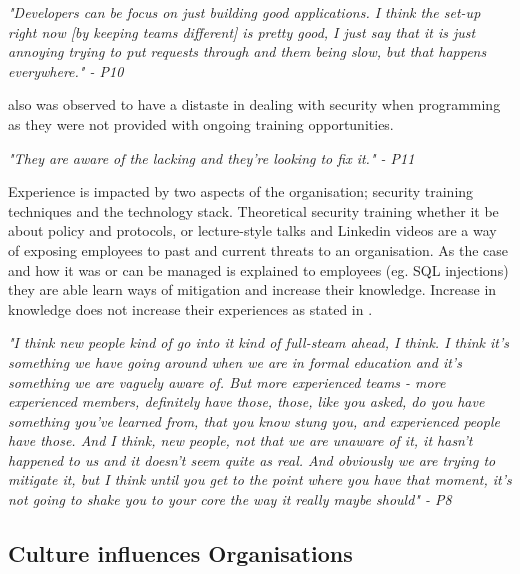 \textit{"Developers can be focus on just building good applications. I think the set-up right now [by keeping teams different] is pretty good, I just say that it is just annoying trying to put requests through and them being slow, but that happens everywhere." - P10}
\newline
\par
[P4] also was observed to have a distaste in dealing with security when programming as they were not provided with ongoing training opportunities. 
\newline
\par
\textit{"They are aware of the lacking and they're looking to fix it." - P11}
\newline
\par
Experience is impacted by two aspects of the organisation; security training techniques and the technology stack. Theoretical security training whether it be about policy and protocols, or lecture-style talks and Linkedin videos are a way of exposing employees to past and current threats to an organisation. As the case and how it was or can be managed is explained to employees  (eg. SQL injections) they are able learn ways of mitigation and increase their knowledge. Increase in knowledge does not increase their experiences as stated in . 
\newline
\par 
\textit{"I think new people kind of go into it kind of full-steam ahead, I think. I think it's something we have going around when we are in formal education and it's something we are vaguely aware of. But more experienced teams - more experienced members, definitely have those, those, like you asked, do you have something you've learned from, that you know stung you, and experienced people have those. And I think, new people, not that we are unaware of it, it hasn't happened to us and it doesn't seem quite as real. And obviously we are trying to mitigate it, but I think until you get to the point where you have that moment, it's not going to shake you to your core the way it really maybe should" - P8}

\subsection{Culture influences Organisations}

